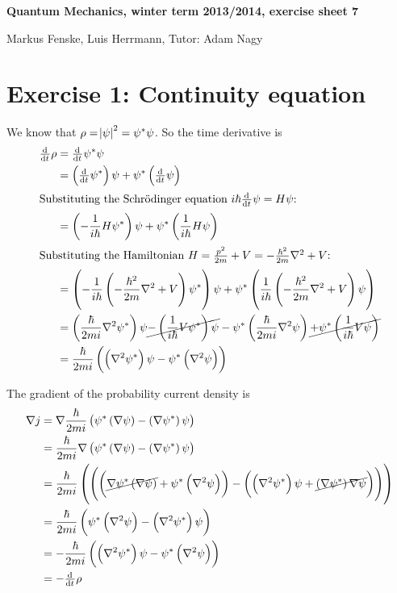 \documentclass[a4paper,german,12pt,smallheadings]{scrartcl}
\begin{document}
\allowdisplaybreaks %
\begin{center}
\bfseries %
\sffamily %
\vspace{-40pt}
Quantum Mechanics, winter term 2013/2014, exercise sheet 7

Markus Fenske, Luis Herrmann, Tutor: Adam Nagy
\vspace{-10pt}
\end{center}

\section*{Exercise 1: Continuity equation}
We know that $\rho = \envert{\psi}^2 = \psi^*\psi$. So the time derivative is
\begin{align*}
  \od{}{t} \rho &= \od{}{t} \psi^*\psi \\
                         &= \del{\od{}{t} \psi^*} \psi + \psi^* \del{\od{}{t} \psi} \\
  \intertext{Substituting the Schrödinger equation $i \hbar \od{}{t} \psi = H \psi$:}
  &= \del{-\frac{1}{i\hbar} H \psi^*} \psi + \psi^* \del{\frac{1}{i \hbar} H \psi} \\
  \intertext{Substituting the Hamiltonian $H = \frac{p^2}{2m} + V = -\frac{\hbar^2}{2m} \nabla^2 + V$:}
  &= \del{-\frac{1}{i\hbar} \del{-\frac{\hbar^2}{2m} \nabla^2 + V} \psi^*} \psi + \psi^* \del{\frac{1}{i \hbar} \del{-\frac{\hbar^2}{2m} \nabla^2 + V} \psi} \\
  &= \del{\frac{\hbar}{2 mi} \nabla^2 \psi^*}\psi \cancel{- \del{\frac{1}{i \hbar} V \psi^*}\psi} - \psi^* \del{\frac{\hbar}{2 mi} \nabla^2 \psi} \cancel{+ \psi^* \del{\frac{1}{i \hbar} V \psi}} \\
  &= \frac{\hbar}{2 mi} \del{\del{\nabla^2 \psi^*}\psi - \psi^* \del{\nabla^2 \psi}}
\end{align*}

The gradient of the probability current density is
\begin{align*}
  \nabla j &= \nabla \frac{\hbar}{2mi} \del{\psi^* \del{\nabla \psi} - \del{\nabla \psi^*} \psi} \\
           &= \frac{\hbar}{2mi} \nabla \del{\psi^* \del{\nabla \psi} - \del{\nabla \psi^*} \psi} \\
           &= \frac{\hbar}{2mi} \del{\del{\del{\cancel{\nabla \psi^* \del{\nabla \psi}} + \psi^* \del{\nabla^2 \psi}} - \del{\del{\nabla^2 \psi^*} \psi + \cancel{\del{\nabla \psi^*} \nabla \psi}}}} \\
           &= \frac{\hbar}{2mi} \del{\psi^* \del{\nabla^2 \psi} - \del{\nabla^2 \psi^*} \psi} \\
           &= -\frac{\hbar}{2mi} \del{\del{\nabla^2 \psi^*}\psi - \psi^* \del{\nabla^2 \psi}} \\
           &= -\od{}{t} \rho
\end{align*}
\end{document}
